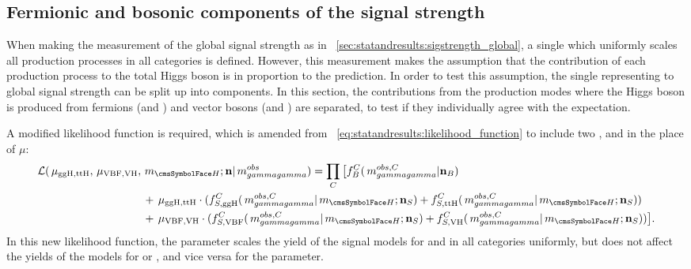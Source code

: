 \subsection{Fermionic and bosonic components of the signal strength}
\label{sec:statandresults:rvrf}

When making the measurement of the global signal strength as in \Sec~\ref{sec:statandresults:sigstrength_global}, a single \POI which uniformly scales all production processes in all categories is defined. However, this measurement makes the assumption that the contribution of each production process to the total Higgs boson \crosssection is in proportion to the \SM prediction. 
In order to test this assumption, the single \POI representing to global signal strength can be split up into components. In this section, the contributions from the production modes where the Higgs boson is produced from fermions (\ggH and \ttH) and vector bosons (\VBF and \VH) are separated, to test if they individually agree with the \SM expectation. 

A modified likelihood function is required, which is amended from \Eq~\ref{eq:statandresults:likelihood_function} to include two \POI\s, \muF and \muV in the place of $\mu$:
\begin{equation}
\label{eq:statandresults:likelihood_function_muVmuF}
\begin{split} 
\mathcal{L}(\muF, \muV,{}& \mH; \mathbf{n} | \mgg^{obs} ) = \prod_{C} \big[ f^C_B(\mgg^{obs,C} | \mathbf{n}_B )   \\
& +\muF \cdot ( f^C_{S,{\text{ggH}}}(\mgg^{obs,C} |\mH; \mathbf{n}_S) + f^C_{S,{\text{ttH}}}(\mgg^{obs,C} |\mH; \mathbf{n}_S) ) \\ 
& +\muV \cdot ( f^C_{S,{\text{VBF}}}(\mgg^{obs,C} |\mH; \mathbf{n}_S) + f^C_{S,{\text{VH}}}(\mgg^{obs,C} |\mH; \mathbf{n}_S) )\big].
 \end{split} 
\end{equation}
In this new likelihood function, the \muF parameter scales the yield of the signal models for \ggH and \ttH in all categories uniformly, but does not affect the yields of the models for \VBF or \VH, and vice versa for the \muV parameter.

